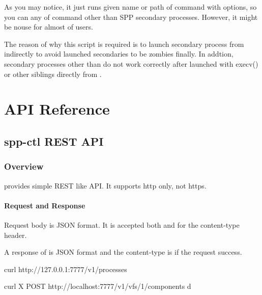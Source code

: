 \documentclass[a4paper,11pt,openany,oneside,english]{sphinxmanual}
\begin{document}
As you may notice, it just runs given name or path of command with options,
so you can any of command other than SPP secondary processes. However, it
might be nouse for almost of users.

The reason of why this script is required is to launch secondary process from
 indirectly to avoid launched secondaries to be zombies finally.
In addtion, secondary processes other than  do not work correctly
after launched with execv() or other siblings directly from .


\chapter{API Reference}
\label{\detokenize{api_ref/index:api-reference}}\label{\detokenize{api_ref/index:spp-api-ref-index}}\label{\detokenize{api_ref/index::doc}}

\section{spp-ctl REST API}
\label{\detokenize{api_ref/overview:spp-ctl-rest-api}}\label{\detokenize{api_ref/overview:spp-ctl-rest-api-ref}}\label{\detokenize{api_ref/overview::doc}}

\subsection{Overview}
\label{\detokenize{api_ref/overview:overview}}
 provides simple REST like API. It supports http only, not https.


\subsubsection{Request and Response}
\label{\detokenize{api_ref/overview:request-and-response}}
Request body is JSON format.
It is accepted both  and 
for the content-type header.

A response of  is JSON format and the content-type is
 if the request success.

\begin{sphinxVerbatim}[commandchars=\\\{\},formatcom=\footnotesize]
 curl http://127.0.0.1:7777/v1/processes

 curl \PYGZhy{}X POST http://localhost:7777/v1/vfs/1/components 
  \PYGZhy{}d 
\end{sphinxVerbatim}
\end{document}
